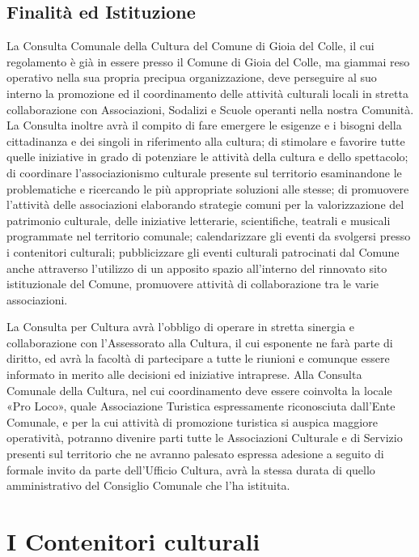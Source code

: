 \documentclass[a4paper,14pt,italian]{sphinxmanual}
\begin{document}
\subsection{Finalità ed Istituzione}
\label{\detokenize{cultura:finalita-ed-istituzione}}
La Consulta Comunale della Cultura del Comune di Gioia del Colle, il cui regolamento è già in essere presso il Comune di Gioia del Colle, ma giammai reso operativo nella sua propria precipua organizzazione, deve perseguire al suo interno la promozione ed il coordinamento delle attività culturali locali in stretta collaborazione con Associazioni, Sodalizi e Scuole operanti nella nostra Comunità.
La Consulta inoltre avrà il compito di fare emergere le esigenze e i bisogni della cittadinanza e dei singoli in riferimento alla cultura; di stimolare e favorire tutte quelle iniziative in grado di potenziare le attività della cultura e dello spettacolo; di coordinare l’associazionismo culturale presente sul territorio esaminandone le problematiche e ricercando le più appropriate soluzioni alle stesse; di promuovere l’attività delle associazioni elaborando strategie comuni per la valorizzazione del patrimonio culturale, delle iniziative letterarie, scientifiche, teatrali e musicali programmate nel territorio comunale; calendarizzare gli eventi da svolgersi presso i contenitori culturali; pubblicizzare gli eventi culturali patrocinati dal Comune anche attraverso l’utilizzo di un apposito spazio all’interno del rinnovato sito istituzionale del Comune, promuovere attività di collaborazione tra le varie associazioni.

La Consulta per Cultura avrà l’obbligo di operare in stretta sinergia e collaborazione con l’Assessorato alla Cultura, il cui esponente ne farà parte di diritto, ed avrà la facoltà di partecipare a tutte le riunioni e comunque essere informato in merito alle decisioni ed iniziative intraprese.
Alla Consulta Comunale della Cultura, nel cui coordinamento deve essere coinvolta la locale «Pro Loco», quale Associazione Turistica espressamente riconosciuta dall’Ente Comunale, e per la cui attività di promozione turistica si auspica maggiore operatività, potranno divenire parti tutte le Associazioni Culturale e di Servizio presenti sul territorio che ne avranno palesato espressa adesione a seguito di formale invito da parte dell’Ufficio Cultura, avrà la stessa durata di quello amministrativo del Consiglio Comunale che l’ha istituita.


\section{I Contenitori culturali}
\label{\detokenize{cultura:i-contenitori-culturali}}
\end{document}
